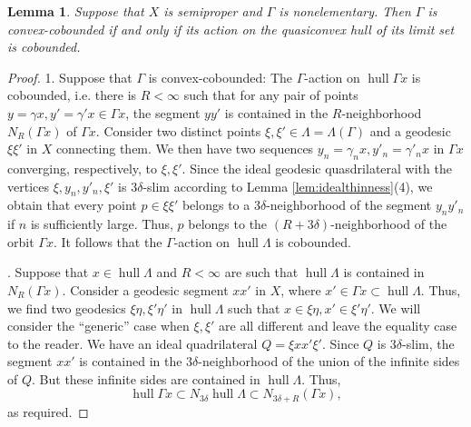 \documentclass[12pt]{amsbook}%
\newtheorem{lem}[thm]{Lemma}
\theoremstyle{definition}
\theoremstyle{remark}
\numberwithin{section}{chapter}
\numberwithin{subsection}{section}
\numberwithin{figure}{chapter}
\DeclareMathOperator{\hull}{hull}
\def\Ga{\Gamma}
\def\ga{\gamma}
\def\La{\Lambda}
\def\kap{}
\begin{document}

\begin{lem}
Suppose that $X$ is semiproper and $\Ga$ is nonelementary. Then $\Ga$ is convex-cobounded if and only if its action on the quasiconvex hull of its limit set is cobounded. 
\end{lem}
\begin{proof} 1. Suppose that $\Ga$ is convex-cobounded: The $\Ga$-action on $\hull \Ga x$ is cobounded, i.e. there 
is $R<\infty$ such that for any pair of points $y=\ga x, y'=\ga'x \in \Ga x$, the segment $yy'$ is contained in the $R$-neighborhood $N_R(\Ga x)$ of $\Ga x$. Consider two distinct points $\xi, \xi'\in \La=\La(\Ga)$ and a geodesic $\xi \xi'$ in $X$ connecting them. We then have two sequences $y_n=\ga_n x, y'_n=\ga'_n x$ in $\Ga x$ converging, respectively, to $\xi, \xi'$. Since the ideal geodesic quasdrilateral with the vertices  $\xi, y_n, y'_n, \xi'$ is $3\delta$-slim according to Lemma \ref{lem:idealthinness}(4), we obtain that every point $p\in \xi \xi'$ belongs to a $3\delta$-neighborhood of the segment $y_ny'_n$ if $n$ is sufficiently large. Thus, $p$ belongs to the $(R+3\delta)$-neighborhood of the orbit $\Ga x$. It follows that the $\Ga$-action on $\hull \La$ is cobounded. 

.  Suppose that $x\in \hull \La$ and $R<\infty$ are such that $\hull \La$ is contained in $N_R(\Ga x)$. Consider a geodesic segment $xx'$ in $X$, where $x'\in \Ga x\subset \hull \La$. Thus, we find two geodesics $\xi\eta, \xi'\eta'$ in $\hull \La$ such that $x\in \xi\eta, x'\in \xi'\eta'$. We will consider the ``generic'' case when $\xi, \xi'$ are all different and leave the equality case to the reader. We have an ideal quadrilateral $Q=\xi x x'\xi'$. Since $Q$ is $3\delta$-slim, the segment $xx'$ is contained in the $3\delta$-neighborhood of the union of the infinite sides of $Q$. But these infinite sides are contained in $\hull \La$. Thus, 
$$
\hull \Ga x\subset N_{3\delta} \hull \La\subset N_{3\delta +R}(\Ga x),
$$
as required. 
\end{proof}
\end{document}

